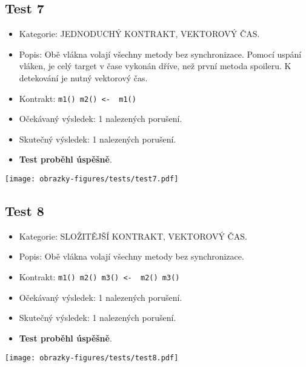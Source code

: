 \subsection*{Test 7}

\begin{itemize}
\item Kategorie: JEDNODUCHÝ KONTRAKT, VEKTOROVÝ ČAS.
\item Popis: Obě vlákna volají všechny metody bez synchronizace. Pomocí uspání vláken, je celý target v čase vykonán dříve, než první metoda spoileru. K detekování je nutný vektorový čas.
\item Kontrakt: \texttt{m1() m2() <- { m1() }}
\item Očekávaný výsledek: 1 nalezených porušení.
\item Skutečný výsledek: 1 nalezených porušení.
\item \textbf{Test proběhl úspěšně}.
\end{itemize}

\begin{center}
    \centering
    \texttt{[image: obrazky-figures/tests/test7.pdf]}
    \label{test7}
\end{center}
\subsection*{Test 8}

\begin{itemize}
\item Kategorie: SLOŽITĚJŠÍ KONTRAKT, VEKTOROVÝ ČAS.
\item Popis: Obě vlákna volají všechny metody bez synchronizace.
\item Kontrakt: \texttt{m1() m2() m3() <- { m2() m3() }}
\item Očekávaný výsledek: 1 nalezených porušení.

\item Skutečný výsledek: 1 nalezených porušení.
\item \textbf{Test proběhl úspěšně}.

\end{itemize}
\begin{center}
    \centering
    \texttt{[image: obrazky-figures/tests/test8.pdf]}
    \label{test8}
\end{center}

